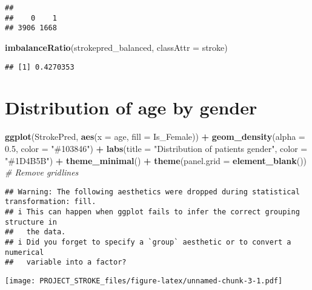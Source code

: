 \documentclass[
]{article}
\newenvironment{Shaded}{\begin{snugshade}}{\end{snugshade}}
\newcommand{\AttributeTok}[1]{\textcolor[rgb]{0.13,0.29,0.53}{#1}}
\newcommand{\CommentTok}[1]{\textcolor[rgb]{0.56,0.35,0.01}{\textit{#1}}}
\newcommand{\FloatTok}[1]{\textcolor[rgb]{0.00,0.00,0.81}{#1}}
\newcommand{\FunctionTok}[1]{\textcolor[rgb]{0.13,0.29,0.53}{\textbf{#1}}}
\newcommand{\NormalTok}[1]{#1}
\newcommand{\SpecialCharTok}[1]{\textcolor[rgb]{0.81,0.36,0.00}{\textbf{#1}}}
\newcommand{\StringTok}[1]{\textcolor[rgb]{0.31,0.60,0.02}{#1}}
\begin{document}
\begin{verbatim}
## 
##    0    1 
## 3906 1668
\end{verbatim}

\begin{Shaded}
\begin{Highlighting}[]
\FunctionTok{imbalanceRatio}\NormalTok{(strokepred\_balanced, }\AttributeTok{classAttr =} \StringTok{\textquotesingle{}stroke\textquotesingle{}}\NormalTok{)}
\end{Highlighting}
\end{Shaded}

\begin{verbatim}
## [1] 0.4270353
\end{verbatim}

\hypertarget{distribution-of-age-by-gender}{%
\section{Distribution of age by
gender}\label{distribution-of-age-by-gender}}

\begin{Shaded}
\begin{Highlighting}[]
\FunctionTok{ggplot}\NormalTok{(StrokePred, }\FunctionTok{aes}\NormalTok{(}\AttributeTok{x =}\NormalTok{ age, }\AttributeTok{fill =}\NormalTok{ Is\_Female)) }\SpecialCharTok{+}
  \FunctionTok{geom\_density}\NormalTok{(}\AttributeTok{alpha =} \FloatTok{0.5}\NormalTok{, }\AttributeTok{color =} \StringTok{"\#103846"}\NormalTok{) }\SpecialCharTok{+}
  \FunctionTok{labs}\NormalTok{(}\AttributeTok{title =} \StringTok{"Distribution of patients\textquotesingle{} gender"}\NormalTok{,}
       \AttributeTok{color =} \StringTok{"\#1D4B5B"}\NormalTok{) }\SpecialCharTok{+}
  \FunctionTok{theme\_minimal}\NormalTok{() }\SpecialCharTok{+}
  \FunctionTok{theme}\NormalTok{(}\AttributeTok{panel.grid =} \FunctionTok{element\_blank}\NormalTok{())  }\CommentTok{\# Remove gridlines}
\end{Highlighting}
\end{Shaded}

\begin{verbatim}
## Warning: The following aesthetics were dropped during statistical transformation: fill.
## i This can happen when ggplot fails to infer the correct grouping structure in
##   the data.
## i Did you forget to specify a `group` aesthetic or to convert a numerical
##   variable into a factor?
\end{verbatim}

\texttt{[image: PROJECT\_STROKE\_files/figure-latex/unnamed-chunk-3-1.pdf]}
\end{document}
